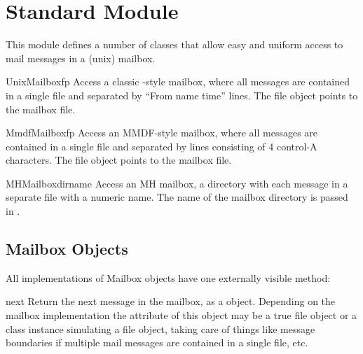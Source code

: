 \section{Standard Module }
\label{module-mailbox}


This module defines a number of classes that allow easy and uniform
access to mail messages in a (unix) mailbox.

\begin{funcdesc}{UnixMailbox}{fp}
Access a classic \UNIX{}-style mailbox, where all messages are contained
in a single file and separated by ``From name time'' lines.
The file object  points to the mailbox file.
\end{funcdesc}

\begin{funcdesc}{MmdfMailbox}{fp}
Access an MMDF-style mailbox, where all messages are contained
in a single file and separated by lines consisting of 4 control-A
characters.  The file object  points to the mailbox file.
\end{funcdesc}

\begin{funcdesc}{MHMailbox}{dirname}
Access an MH mailbox, a directory with each message in a separate
file with a numeric name.
The name of the mailbox directory is passed in .
\end{funcdesc}

\subsection{Mailbox Objects}

All implementations of Mailbox objects have one externally visible
method:

\begin{funcdesc}{next}{}
Return the next message in the mailbox, as a  object.
Depending on the mailbox implementation the  attribute of this
object may be a true file object or a class instance simulating a file object,
taking care of things like message boundaries if multiple mail messages are
contained in a single file, etc.
\end{funcdesc}
